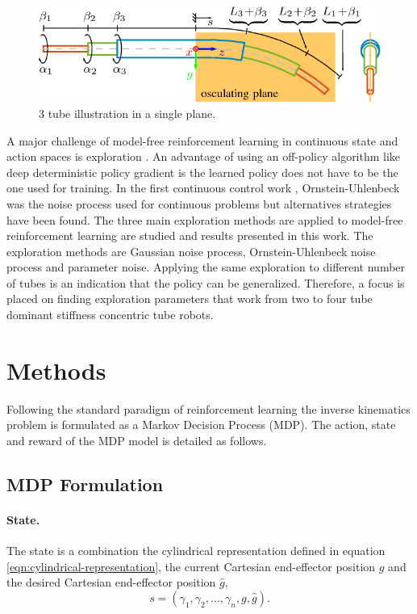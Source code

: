 \begin{figure}
  \includegraphics[width=\linewidth]{images/2-Figure2-1.png}
\caption{3 tube illustration in a single plane. \cite{Grassmann2018}}
\label{fig:constraints}
\end{figure}

A major challenge of model-free reinforcement learning in continuous state and action spaces is exploration \cite{Nair2018}. An advantage of using an off-policy algorithm like deep deterministic policy gradient is the learned policy does not have to be the one used for training. In the first continuous control work \cite{Lillicrap2015}, Ornstein-Uhlenbeck was the noise process used for continuous problems but alternatives strategies have been found. The three main exploration methods are applied to model-free reinforcement learning are studied and results presented in this work. The exploration methods are Gaussian noise process, Ornstein-Uhlenbeck noise process and parameter noise. Applying the same exploration to different number of tubes is an indication that the policy can be generalized. Therefore, a focus is placed on finding exploration parameters that work from two to four tube dominant stiffness concentric tube robots.
\section{Methods}
Following the standard paradigm of reinforcement learning the inverse kinematics problem is formulated as a Markov Decision Process (MDP). The action, state and reward of the MDP model is detailed as follows.
\subsection{MDP Formulation}
\paragraph{State.} The state is a combination the cylindrical representation defined in equation \ref{eqn:cylindrical-representation}, the current Cartesian end-effector position $g$ and the desired Cartesian end-effector position $\hat{g}$,
\begin{equation}
s = \left( \gamma_1, \gamma_2, \dots, \gamma_n, g, \hat{g} \right). \label{eqn:state}
\end{equation}

